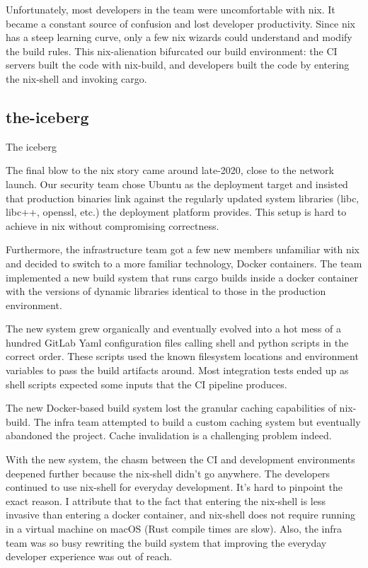 \documentclass{article}
\begin{document}
Unfortunately, most developers in the team were uncomfortable with nix.
It became a constant source of confusion and lost developer productivity.
Since nix has a steep learning curve, only a few nix wizards could understand and modify the build rules.
This nix-alienation bifurcated our build environment: the CI servers built the code with nix-build, and developers built the code by entering the nix-shell and invoking cargo.

\subsection{the-iceberg}{The iceberg}

The final blow to the nix story came around late-2020, close to the network launch.
Our security team chose Ubuntu as the deployment target and insisted that production binaries link against the regularly updated system libraries (libc, libc++, openssl, etc.) the deployment platform provides.
This setup is hard to achieve in nix without compromising correctness.

Furthermore, the infrastructure team got a few new members unfamiliar with nix and decided to switch to a more familiar technology, Docker containers.
The team implemented a new build system that runs cargo builds inside a docker container with the versions of dynamic libraries identical to those in the production environment.

The new system grew organically and eventually evolved into a hot mess of a hundred GitLab Yaml configuration files calling shell and python scripts in the correct order.
These scripts used the known filesystem locations and environment variables to pass the build artifacts around.
Most integration tests ended up as shell scripts expected some inputs that the CI pipeline produces.

The new Docker-based build system lost the granular caching capabilities of nix-build.
The infra team attempted to build a custom caching system but eventually abandoned the project.
Cache invalidation is a challenging problem indeed.

With the new system, the chasm between the CI and development environments deepened further because the nix-shell didn't go anywhere.
The developers continued to use nix-shell for everyday development.
It's hard to pinpoint the exact reason.
I attribute that to the fact that entering the nix-shell is less invasive than entering a docker container, and nix-shell does not require running in a virtual machine on macOS (Rust compile times are slow).
Also, the infra team was so busy rewriting the build system that improving the everyday developer experience was out of reach.
\end{document}
